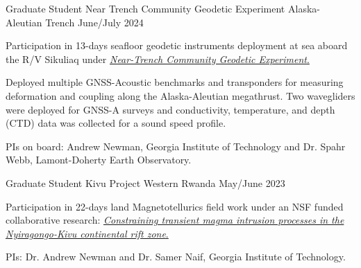 

\begin{cventries}

  \cventry
    {Graduate Student} %
    {Near Trench Community Geodetic Experiment} %
    {Alaska-Aleutian Trench} %
    {June/July 2024} %
    {
      \begin{cvitems} %
        \item {Participation in 13-days seafloor geodetic instruments deployment at sea aboard the R/V Sikuliaq under \href{https://www.seafloorgeodesy.org/commexp}{\textit{Near-Trench Community Geodetic Experiment}.}}
        \item Deployed multiple GNSS-Acoustic benchmarks and transponders for measuring deformation and coupling along the Alaska-Aleutian megathrust. Two wavegliders were deployed for GNSS-A surveys and conductivity, temperature, and depth (CTD) data was collected for a sound speed profile.
        \item PIs on board: Andrew Newman, Georgia Institute of Technology and Dr. Spahr Webb, Lamont-Doherty Earth Observatory.
      \end{cvitems}
    }

  \cventry
    {Graduate Student} %
    {Kivu Project} %
    {Western Rwanda} %
    {May/June 2023} %
    {
      \begin{cvitems} %
        \item {Participation in 22-days land Magnetotellurics field work under an NSF funded collaborative research: \href{https://avnewman.github.io/KIVU/}{\textit{Constraining transient magma intrusion processes in the Nyiragongo-Kivu continental rift zone}.}}
        \item PIs: Dr. Andrew Newman and Dr. Samer Naif, Georgia Institute of Technology.
      \end{cvitems}
    }


\end{cventries}
